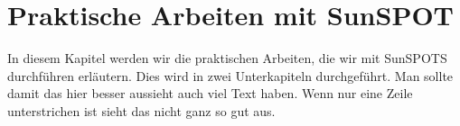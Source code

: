 \chapter{Praktische Arbeiten mit SunSPOT}\label{c:PraktischeArbeiten}

In diesem Kapitel werden wir die praktischen Arbeiten, die wir mit SunSPOTS durchführen erläutern. Dies wird in zwei Unterkapiteln durchgeführt. Man sollte damit das hier besser aussieht auch viel Text haben. Wenn nur eine Zeile unterstrichen ist sieht das nicht ganz so gut aus.



